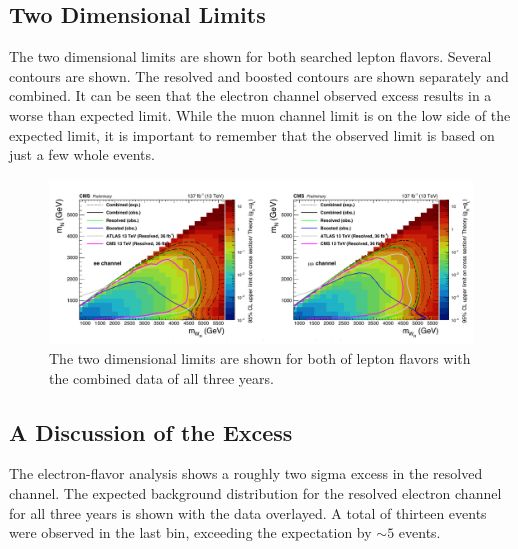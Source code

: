 \subsection{Two Dimensional Limits}
The two dimensional limits are shown for both searched lepton flavors. Several contours are shown. The resolved and boosted contours are shown separately and combined. It can be seen that the electron channel observed excess results in a worse than expected limit. While the muon channel limit is on the low side of the expected limit, it is important to remember that the observed limit is based on just a few whole events.

\begin{figure}[!tbp]
    \centering
    \includegraphics[width=\textwidth]{figures/Results/2D_limit_allyear_unblinded.pdf}
    \caption[
       2 Dimensional Limits.
    ]{
        The two dimensional limits are shown for both of lepton flavors with the combined data of all three years.  
    }
    \label{fig:1Dlimit}
\end{figure}

\subsection{A Discussion of the Excess}
The electron-flavor analysis shows a roughly two sigma excess in the resolved channel. The expected background distribution for the resolved electron channel for all three years is shown with the data overlayed. A total of thirteen events were observed in the last bin, exceeding the expectation by $\sim 5$ events.

